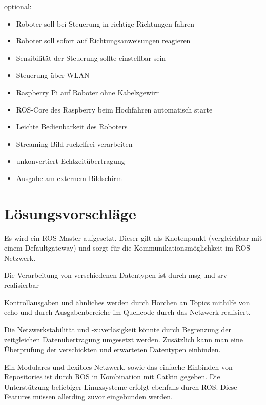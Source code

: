 \documentclass[12pt]{article}
\begin{document}
optional:

\begin{itemize}
\item Roboter soll bei Steuerung in richtige Richtungen fahren
\item Roboter soll sofort auf Richtungsanweisungen reagieren
\item Sensibilität der Steuerung sollte einstellbar sein
\item Steuerung über WLAN
\item Raspberry Pi auf Roboter ohne Kabelzgewirr %
\item ROS-Core des Raspberry beim Hochfahren automatisch starte
\item Leichte Bedienbarkeit des Roboters

\vspace{0,6cm}

\item Streaming-Bild ruckelfrei verarbeiten
\item unkonvertiert Echtzeitübertragung
\item Ausgabe am externem Bildschirm
\end{itemize}


\section{Lösungsvorschläge}


Es wird ein ROS-Master aufgesetzt. Dieser gilt als Knotenpunkt (vergleichbar mit einem Defaultgateway) und sorgt für die Kommunikationsmöglichkeit im ROS-Netzwerk.

Die Verarbeitung von verschiedenen Datentypen ist durch msg und srv realisierbar

Kontrollausgaben und ähnliches werden durch Horchen an Topics mithilfe von echo und durch Ausgabenbereiche im Quellcode durch das Netzwerk realisiert.
 

Die Netzwerkstabilität und -zuverläsigkeit könnte durch Begrenzung der zeitgleichen Datenübertragung umgesetzt werden. Zusätzlich kann man eine Überprüfung der verschickten und erwarteten Datentypen einbinden.


Ein Modulares und flexibles Netzwerk, sowie das einfache Einbinden von Repositories ist durch ROS in Kombination mit Catkin gegeben. Die Unterstützung beliebiger Linuxsysteme erfolgt ebenfalls durch ROS. Diese Features müssen allerding zuvor eingebunden werden.
\end{document}
